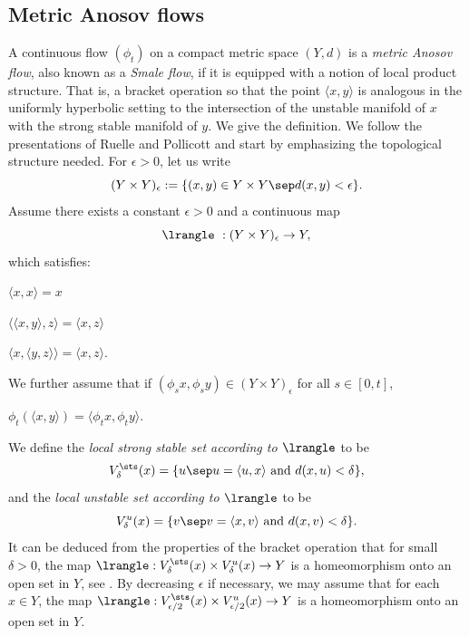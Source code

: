 \subsection{Metric Anosov flows}\label{sec:smale}
A continuous flow $(\phi_t)$ on a compact metric space $(Y, d)$ is a \emph{metric Anosov flow}, also known as a \emph{Smale flow}, if it is equipped with a notion of local product structure. That is, a bracket operation so that the point $\langle x,y\rangle $ is analogous in the uniformly hyperbolic setting to the intersection of the unstable manifold of $x$ with the strong stable manifold of $y$. We give the definition. We follow the presentations of Ruelle and Pollicott and start by emphasizing the topological structure needed. For $\epsilon>0$, let us write
\[ (Y \times Y)_\epsilon := \{(x,y) \in Y \times Y \sep d(x,y) < \epsilon\}. \]
Assume there exists a constant $\epsilon>0$ and a continuous map
\[ \lrangle ~: (Y \times Y)_\epsilon \to Y, \]
which satisfies:
\begin{enumeratea}
\item\label{enum:a} $\langle x,x\rangle =x$
\item\label{enum:b} $\langle \langle x,y\rangle,z\rangle =\langle x, z\rangle $
\item\label{enum:c} $\langle x, \langle y,z\rangle \rangle =\langle x, z\rangle $.
\end{enumeratea}
\noindent
We further assume that if $(\phi_sx,\phi_sy) \in (Y\times Y)_\epsilon$ for all $s\in[0,t]$,
\begin{enumeratea}\setcounter{enumi}{3}
\item\label{enum:d}$\phi_t(\langle x,y \rangle)= \langle \phi_tx, \phi_ty \rangle$.
\end{enumeratea}
\noindent
We define the \emph{local strong stable set according to $\lrangle $} to be
\[ V^{\sts}_\delta (x) = \{ u \sep u = \langle u,x\rangle \mathrm{ ~and~ } d(x, u)< \delta \}, \]
and the \emph{local unstable set according to $\lrangle $} to be
\[ V^{u}_\delta (x) = \{ v \sep v = \langle x,v\rangle \mathrm{ ~and~ } d(x, v)< \delta \}. \]
It can be deduced from the properties of the bracket operation that for small $\delta>0$, the map $\lrangle : V^{\sts}_{\delta} (x) \times V^{u}_{\delta} (x) \to Y$ is a homeomorphism onto an open set in $Y$, see \cite[\S7.1]{Ruelle}.
By decreasing $\epsilon$ if necessary, we may assume that for each $x \in Y$, the map $\lrangle : V^{\sts}_{\epsilon/2} (x) \times V^{u}_{\epsilon/2} (x) \to Y$ is a homeomorphism onto an open set in $Y$.

